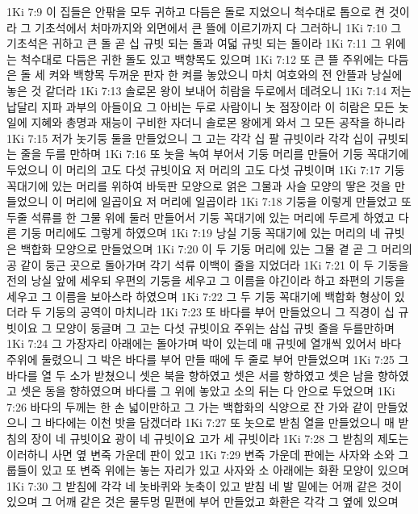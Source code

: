 1Ki 7:9  이 집들은 안팎을 모두 귀하고 다듬은 돌로 지었으니 척수대로 톱으로 켠 것이라 그 기초석에서 처마까지와 외면에서 큰 뜰에 이르기까지 다 그러하니
1Ki 7:10  그 기초석은 귀하고 큰 돌 곧 십 규빗 되는 돌과 여덟 규빗 되는 돌이라
1Ki 7:11  그 위에는 척수대로 다듬은 귀한 돌도 있고 백향목도 있으며
1Ki 7:12  또 큰 뜰 주위에는 다듬은 돌 세 켜와 백향목 두꺼운 판자 한 켜를 놓았으니 마치 여호와의 전 안뜰과 낭실에 놓은 것 같더라
1Ki 7:13  솔로몬 왕이 보내어 히람을 두로에서 데려오니
1Ki 7:14  저는 납달리 지파 과부의 아들이요 그 아비는 두로 사람이니 놋 점장이라 이 히람은 모든 놋 일에 지혜와 총명과 재능이 구비한 자더니 솔로몬 왕에게 와서 그 모든 공작을 하니라
1Ki 7:15  저가 놋기둥 둘을 만들었으니 그 고는 각각 십 팔 규빗이라 각각 십이 규빗되는 줄을 두를 만하며
1Ki 7:16  또 놋을 녹여 부어서 기둥 머리를 만들어 기둥 꼭대기에 두었으니 이 머리의 고도 다섯 규빗이요 저 머리의 고도 다섯 규빗이며
1Ki 7:17  기둥 꼭대기에 있는 머리를 위하여 바둑판 모양으로 얽은 그물과 사슬 모양의 땋은 것을 만들었으니 이 머리에 일곱이요 저 머리에 일곱이라
1Ki 7:18  기둥을 이렇게 만들었고 또 두줄 석류를 한 그물 위에 둘러 만들어서 기둥 꼭대기에 있는 머리에 두르게 하였고 다른 기둥 머리에도 그렇게 하였으며
1Ki 7:19  낭실 기둥 꼭대기에 있는 머리의 네 규빗은 백합화 모양으로 만들었으며
1Ki 7:20  이 두 기둥 머리에 있는 그물 곁 곧 그 머리의 공 같이 둥근 곳으로 돌아가며 각기 석류 이백이 줄을 지었더라
1Ki 7:21  이 두 기둥을 전의 낭실 앞에 세우되 우편의 기둥을 세우고 그 이름을 야긴이라 하고 좌편의 기둥을 세우고 그 이름을 보아스라 하였으며
1Ki 7:22  그 두 기둥 꼭대기에 백합화 형상이 있더라 두 기둥의 공역이 마치니라
1Ki 7:23  또 바다를 부어 만들었으니 그 직경이 십 규빗이요 그 모양이 둥글며 그 고는 다섯 규빗이요 주위는 삼십 규빗 줄을 두를만하며
1Ki 7:24  그 가장자리 아래에는 돌아가며 박이 있는데 매 규빗에 열개씩 있어서 바다 주위에 둘렸으니 그 박은 바다를 부어 만들 때에 두 줄로 부어 만들었으며
1Ki 7:25  그 바다를 열 두 소가 받쳤으니 셋은 북을 향하였고 셋은 서를 향하였고 셋은 남을 향하였고 셋은 동을 향하였으며 바다를 그 위에 놓았고 소의 뒤는 다 안으로 두었으며
1Ki 7:26  바다의 두께는 한 손 넓이만하고 그 가는 백합화의 식양으로 잔 가와 같이 만들었으니 그 바다에는 이천 밧을 담겠더라
1Ki 7:27  또 놋으로 받침 열을 만들었으니 매 받침의 장이 네 규빗이요 광이 네 규빗이요 고가 세 규빗이라
1Ki 7:28  그 받침의 제도는 이러하니 사면 옆 변죽 가운데 판이 있고
1Ki 7:29  변죽 가운데 판에는 사자와 소와 그룹들이 있고 또 변죽 위에는 놓는 자리가 있고 사자와 소 아래에는 화환 모양이 있으며
1Ki 7:30  그 받침에 각각 네 놋바퀴와 놋축이 있고 받침 네 발 밑에는 어깨 같은 것이 있으며 그 어깨 같은 것은 물두멍 밑편에 부어 만들었고 화환은 각각 그 옆에 있으며
